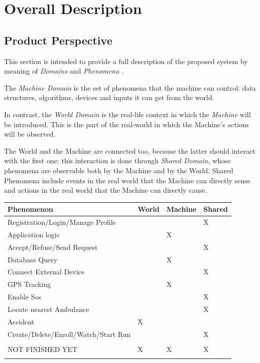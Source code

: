 \documentclass[a4paper]{article}
\begin{document}
\section{Overall Description}
    \subsection{Product Perspective}
    This section is intended to provide a full description of the proposed system by meaning of \textit{Domains} and \textit{Phenomena} \cite{zave1997four}.
    
    The \textit{Machine Domain} is the set of phenomena that the machine can control: data structures, algorithms, devices and inputs it can get from the world.
    
    In contrast, the \textit{World Domain} is the real-life context in which the \textit{Machine} will be introduced. This is the part of the real-world in which the Machine’s actions will be observed.
    
    The World and the Machine are connected too, because the latter should interact with the first one: this interaction is done through \textit{Shared Domain}, whose phenomena are observable both by the Machine and by the World. Shared Phenomena include events in the real world that the Machine can directly sense and actions in the real world that the Machine can directly cause.
    \begin{table}[!ht]
    \centering
    \begin{tabular}{|l|l|l|l|}
    \hline
     \textbf{Phenomenon} & \textbf{World} & \textbf{Machine} & \textbf{Shared}\\ \hline
     Registration/Login/Manage Profile & & & X \\ \hline
     Application logic & & X & \\ \hline
     Accept/Refuse/Send Request & & & X \\ \hline
     Database Query & & X & \\ \hline
     Connect External Device & & & X \\ \hline
     GPS Tracking & & X & \\ \hline
     Enable Sos & & & X \\ \hline
     Locate nearest Ambulance & & & X \\ \hline
     Accident & X & & \\ \hline
     Create/Delete/Enroll/Watch/Start Run & & & X \\ \hline
     & & & \\ \hline
     NOT FINISHED YET & X & X & X \\ \hline
     & & & \\ \hline
    \end{tabular}
    \end{table}
    
\end{document}

